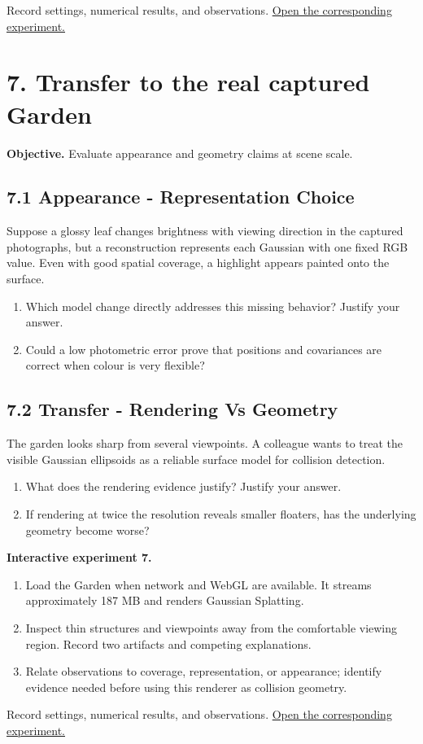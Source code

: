 \documentclass[11pt,a4paper]{article}
\begin{document}
Record settings, numerical results, and observations.
\href{https://sosekie.github.io/Unibe-CVG-CV-Interactive-Labs/tutorial-09/#nerf}{Open the corresponding experiment.}\par
{}\section*{7. Transfer to the real captured Garden}
\noindent\textbf{Objective.} Evaluate appearance and geometry claims at scene scale.
\subsection*{7.1 Appearance - Representation Choice}
Suppose a glossy leaf changes brightness with viewing direction in the captured photographs, but a reconstruction represents each Gaussian with one fixed RGB value.
Even with good spatial coverage, a highlight appears painted onto the surface.
\begin{enumerate}[label=(\alph*),nosep]
\item Which model change directly addresses this missing behavior?
Justify your answer.
\item Could a low photometric error prove that positions and covariances are correct when colour is very flexible?
\end{enumerate}
\subsection*{7.2 Transfer - Rendering Vs Geometry}
The garden looks sharp from several viewpoints.
A colleague wants to treat the visible Gaussian ellipsoids as a reliable surface model for collision detection.
\begin{enumerate}[label=(\alph*),nosep]
\item What does the rendering evidence justify?
Justify your answer.
\item If rendering at twice the resolution reveals smaller floaters, has the underlying geometry become worse?
\end{enumerate}
\noindent\textbf{Interactive experiment 7.}\begin{enumerate}[nosep]
\item Load the Garden when network and WebGL are available.
It streams approximately 187 MB and renders Gaussian Splatting.
\item Inspect thin structures and viewpoints away from the comfortable viewing region.
Record two artifacts and competing explanations.
\item Relate observations to coverage, representation, or appearance; identify evidence needed before using this renderer as collision geometry.
\end{enumerate}
Record settings, numerical results, and observations.
\href{https://sosekie.github.io/Unibe-CVG-CV-Interactive-Labs/tutorial-09/#highres}{Open the corresponding experiment.}\par
\end{document}

